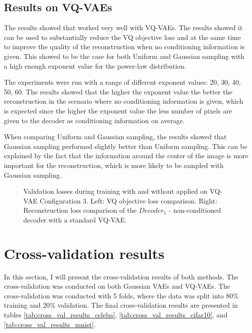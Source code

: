 \subsection{Results on VQ-VAEs}

The results showed that  worked very well with VQ-VAEs. The results showed it can be used to substantially reduce the VQ objective loss and at the same time to improve the quality of the reconstruction when no conditioning information is given. This showed to be the case for both Uniform and Gaussian sampling with a high enough exponent value for the power-law distribution.

The experiments were run with a range of different exponent values: 20, 30, 40, 50, 60. The results showed that the higher the exponent value the better the reconstruction in the scenario where no conditioning information is given, which is expected since the higher the exponent value the less number of pixels are given to the decoder as conditioning information on average.

When comparing Uniform and Gaussian sampling, the results showed that Gaussian sampling performed slightly better than Uniform sampling. This can be explained by the fact that the information around the center of the image is more important for the reconstruction, which is more likely to be sampled with Gaussian sampling.

\begin{figure}[H]
    \centering
    \scalebox{0.48}{}
    \scalebox{0.48}{}
    \caption[Validation loss comparison during training of a VQ-VAE.]
    {
        Validation losses during training with and without  applied on VQ-VAE Configuration 3.
        Left: VQ objective loss comparison. Right: Reconstruction loss comparison of the $Decoder_1$ - non-conditioned decoder with a standard VQ-VAE.
    }
    \label{fig:results_method2_vq_vae}
\end{figure}

\section{Cross-validation results}

In this section, I will present the cross-validation results of both methods. The cross-validation was conducted on both Gaussian VAEs and VQ-VAEs. The cross-validation was conducted with 5 folds, where the data was split into 80\% training and 20\% validation.
The final cross-validation results are presented in tables \ref{tab:cross_val_results_celeba}, \ref{tab:cross_val_results_cifar10}, and \ref{tab:cross_val_results_mnist}.

